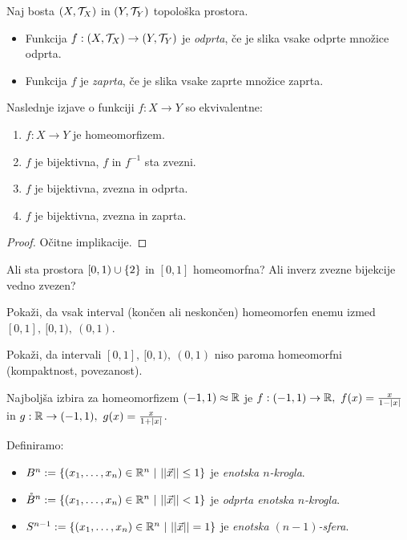 \begin{definicija}
    Naj bosta $(X, \mathcal{T}_X)$ in $(Y, \mathcal{T}_Y)$ topološka prostora.
    \begin{itemize}
        \item Funkcija $f: (X, \mathcal{T}_X) \to (Y, \mathcal{T}_Y)$ je \emph{odprta}, če je slika vsake odprte množice odprta.
        \item Funkcija $f$ je \emph{zaprta}, če je slika vsake zaprte množice zaprta.
    \end{itemize}     
\end{definicija}

\begin{trditev}
    Naslednje izjave o funkciji $f: X \to Y$ so ekvivalentne:
    \begin{enumerate}
        \item $f: X \to Y$ je homeomorfizem.
        \item $f$ je bijektivna, $f$ in $f^{-1}$ sta zvezni.
        \item $f$ je bijektivna, zvezna in odprta.
        \item $f$ je bijektivna, zvezna in zaprta.
    \end{enumerate}
\end{trditev}

\begin{proof}
    Očitne implikacije.
\end{proof}

\begin{primer} 
    Ali sta prostora $[0, 1) \cup \left\{2\right\}$ in $[0,1]$ homeomorfna? Ali inverz zvezne bijekcije vedno zvezen?
\end{primer}

\begin{primer}
    Pokaži, da vsak interval (končen ali neskončen) homeomorfen enemu izmed $[0,1], \ [0, 1), \ (0,1)$.

    Pokaži, da intervali $[0,1], \ [0, 1), \ (0,1)$ niso paroma homeomorfni  (kompaktnost, povezanost).
\end{primer}

\begin{primer}
    Najboljša izbira za homeomorfizem $(-1, 1) \approx \mathbb{R}$ je $f: (-1, 1) \to \R, \ f(x) = \frac{x}{1 - |x|}$ in $g: \mathbb{R} \to (-1, 1), \ g(x) = \frac{x}{1+|x|}$.
\end{primer}

\begin{definicija} Definiramo:
    \begin{itemize}
        \item $B^n := \left\{(x_1, \ldots, x_n) \in \mathbb{R}^n \ | \ ||\vec{x}|| \leq 1\right\}$ je \emph{enotska $n$-krogla}.
        \item $\mathring{B}^n := \left\{(x_1, \ldots, x_n) \in \mathbb{R}^n \ | \ ||\vec{x}|| < 1\right\}$ je \emph{odprta enotska $n$-krogla}.
        \item $S^{n-1} := \left\{(x_1, \ldots, x_n) \in \mathbb{R}^n \ | \ ||\vec{x}|| = 1\right\}$ je \emph{enotska $(n-1)$-sfera}.
    \end{itemize}
\end{definicija}

